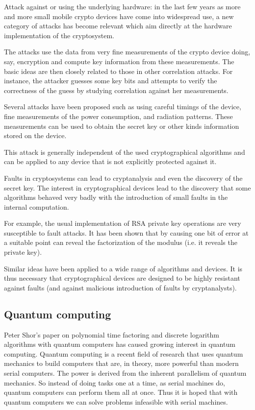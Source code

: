 \documentclass[12pt]{article}
\begin{document}
Attack against or using the underlying hardware: in the last few years as more and more small mobile crypto devices have come into widespread use, a new category of attacks has become relevant which aim directly at the hardware implementation of the cryptosystem.

The attacks use the data from very fine measurements of the crypto device doing, say, encryption and compute key information from these measurements. The basic ideas are then closely related to those in other correlation attacks. For instance, the attacker guesses some key bits and attempts to verify the correctness of the guess by studying correlation against her measurements.

Several attacks have been proposed such as using careful timings of the device, fine measurements of the power consumption, and radiation patterns. These measurements can be used to obtain the secret key or other kinds information stored on the device.

This attack is generally independent of the used cryptographical algorithms and can be applied to any device that is not explicitly protected against it.

Faults in cryptosystems can lead to cryptanalysis and even the discovery of the secret key. The interest in
cryptographical devices lead to the discovery that some algorithms behaved very badly with the introduction of small faults in the internal computation.

For example, the usual implementation of RSA private key operations are very susceptible to fault attacks. It has been shown that by causing one bit of error at a suitable point can reveal the factorization of the modulus (i.e. it reveals the private key).

Similar ideas have been applied to a wide range of algorithms and devices. It is thus necessary that cryptographical devices are designed to be highly resistant against faults (and against malicious introduction of faults by cryptanalysts).

\subsection{Quantum computing}
Peter Shor's paper on polynomial time factoring and discrete logarithm algorithms
with quantum computers has caused growing interest in quantum computing. Quantum computing is a recent field of research that uses quantum mechanics to build computers that are, in theory, more powerful than modern serial computers. The power is derived from the inherent parallelism of quantum mechanics. So instead of doing tasks one at a time, as serial machines do, quantum computers can perform them all at once. Thus it is hoped that with
quantum computers we can solve problems infeasible with serial machines.
\end{document}
